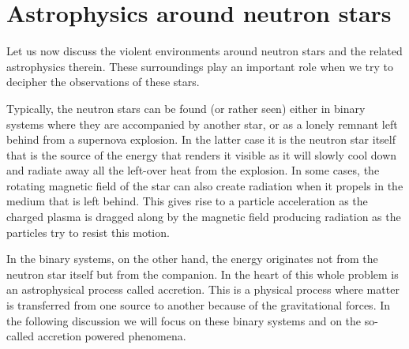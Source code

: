 \chapter{Astrophysics around neutron stars}

Let us now discuss the violent environments around neutron stars and the related astrophysics therein.
These surroundings play an important role when we try to decipher the observations of these stars.

Typically, the neutron stars can be found (or rather seen) either in binary systems where they are accompanied by another star, or as a lonely remnant left behind from a supernova explosion.
In the latter case it is the neutron star itself that is the source of the energy that renders it visible as it will slowly cool down and radiate away all the left-over heat from the explosion.
In some cases, the rotating magnetic field of the star can also create radiation when it propels in the medium that is left behind.
This gives rise to a particle acceleration as the charged plasma is dragged along by the magnetic field producing radiation as the particles try to resist this motion.

In the binary systems, on the other hand, the energy originates not from the neutron star itself but from the companion.
In the heart of this whole problem is an astrophysical process called accretion.
This is a physical process where matter is transferred from one source to another because of the gravitational forces.
In the following discussion we will focus on these binary systems and on the so-called accretion powered phenomena.




